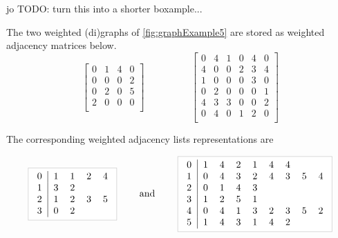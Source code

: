 \begin{Boxample}[0]
jo TODO: turn this into a shorter boxample...

The two weighted (di)graphs of \cref{fig:graphExample5} are
stored as weighted adjacency matrices below.
\[ 
\left[
\begin{array}{cccc}
0 & 1 & 4 & 0  \\
0 & 0 & 0 & 2  \\
0 & 2 & 0 & 5  \\
2 & 0 & 0 & 0  \\
\end{array}
\right]
\hspace{2cm}
\left[
\begin{array}{cccccc}
0 & 4 & 1 & 0 & 4 & 0 \\
4 & 0 & 0 & 2 & 3 & 4 \\
1 & 0 & 0 & 0 & 3 & 0 \\
0 & 2 & 0 & 0 & 0 & 1 \\
4 & 3 & 3 & 0 & 0 & 2 \\
0 & 4 & 0 & 1 & 2 & 0 \\
\end{array}
\right]
\]

The corresponding weighted adjacency lists representations are

$$
\AdjLists{
\begin{tabular}{c|llll}
0 & 1 & 1 & 2 & 4 \\
1 & 3 & 2 &   &   \\
2 & 1 & 2 & 3 & 5 \\
3 & 0 & 2 &   & \\
\end{tabular}
}
\qquad  \text{ and } \qquad
\AdjLists{
\begin{tabular}{c|llllllll}
0 & 1 & 4 & 2 & 1 & 4 & 4 &   & \\
1 & 0 & 4 & 3 & 2 & 4 & 3 & 5 & 4 \\
2 & 0 & 1 & 4 & 3 &   &   &   & \\
3 & 1 & 2 & 5 & 1 &   &   &   & \\
4 & 0 & 4 & 1 & 3 & 2 & 3 & 5 & 2 \\
5 & 1 & 4 & 3 & 1 & 4 & 2 &   & \\
\end{tabular}
}
$$
\end{Boxample}



